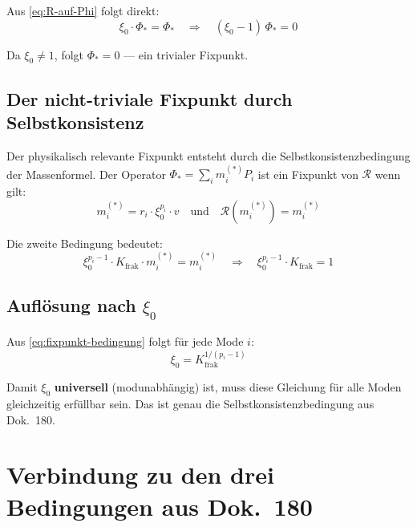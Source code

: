 Aus \eqref{eq:R-auf-Phi} folgt direkt:
\begin{equation}
  \xi_0 \cdot \Phi_* = \Phi_*
  \quad \Rightarrow \quad
  (\xi_0 - 1)\,\Phi_* = 0
\end{equation}

Da $\xi_0 \neq 1$, folgt $\Phi_* = 0$ — ein trivialer Fixpunkt.

\subsection{Der nicht-triviale Fixpunkt durch Selbstkonsistenz}

Der physikalisch relevante Fixpunkt entsteht durch die
Selbstkonsistenzbedingung der Massenformel. Der Operator
$\Phi_* = \sum_i m_i^{(*)} P_i$ ist ein Fixpunkt von $\mathcal{R}$
wenn gilt:
\begin{equation}
  m_i^{(*)} = r_i \cdot \xi_0^{p_i} \cdot v
  \quad \text{und} \quad
  \mathcal{R}(m_i^{(*)}) = m_i^{(*)}
  \label{eq:selbstkonsistenz}
\end{equation}

Die zweite Bedingung bedeutet:
\begin{equation}
  \xi_0^{p_i - 1} \cdot K_{\text{frak}} \cdot m_i^{(*)}
  = m_i^{(*)}
  \quad \Rightarrow \quad
  \xi_0^{p_i - 1} \cdot K_{\text{frak}} = 1
  \label{eq:fixpunkt-bedingung}
\end{equation}

\subsection{Auflösung nach \texorpdfstring{$\xi_0$}{xi0}}

Aus \eqref{eq:fixpunkt-bedingung} folgt für jede Mode $i$:
\begin{equation}
  \xi_0 = K_{\text{frak}}^{1/(p_i-1)}
  \label{eq:xi0-aus-fixpunkt}
\end{equation}

Damit $\xi_0$ \textbf{universell} (modunabhängig) ist, muss diese
Gleichung für alle Moden gleichzeitig erfüllbar sein. Das ist genau
die Selbstkonsistenzbedingung aus Dok.~180.

\section{Verbindung zu den drei Bedingungen aus Dok.~180}

